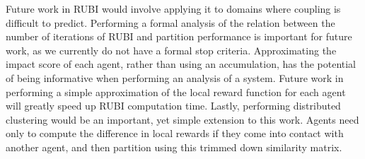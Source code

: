 \documentclass[letterpaper]{article}
\begin{document}
Future work in RUBI would involve applying it to domains where coupling is difficult to predict. Performing a formal analysis of the relation between the number of iterations of RUBI and partition performance is important for future work, as we currently do not have a formal stop criteria. Approximating the impact score of each agent, rather than using an accumulation, has the potential of being informative when performing an analysis of a system. Future work in performing a simple approximation of the local reward function for each agent will greatly speed up RUBI computation time. Lastly, performing distributed clustering would be an important, yet simple extension to this work. Agents need only to compute the difference in local rewards if they come into contact with another agent, and then partition using this trimmed down similarity matrix. 
\label{sec:CONCLUSION}




\end{document}

